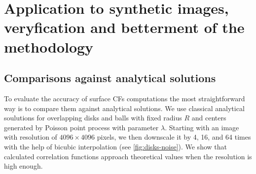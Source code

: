 \documentclass[reprint,amsmath,amssymb,aps,pre,showkeys,showpacs]{revtex4-1}
\begin{document}
\section{Application to synthetic images, veryfication and betterment of the methodology}
\label{sec:results}
\subsection{Comparisons against analytical solutions}
\label{sec:comparison}
To evaluate the accuracy of surface CFs computations the most straightforward
way is to compare them against analytical solutions. We use classical
analytical soulutions for overlapping disks and balls with fixed radius $R$ and
centers generated by Poisson point process with parameter $\lambda$. Starting
with an image with resolution of $4096 \times 4096$ pixels, we then downscale it
by 4, 16, and 64 times with the help of bicubic interpolation
\cite{ledesma2018effect} (see \cref{fig:disks-noise}). We show that calculated
correlation functions approach theoretical values when the resolution is high
enough.
\end{document}
